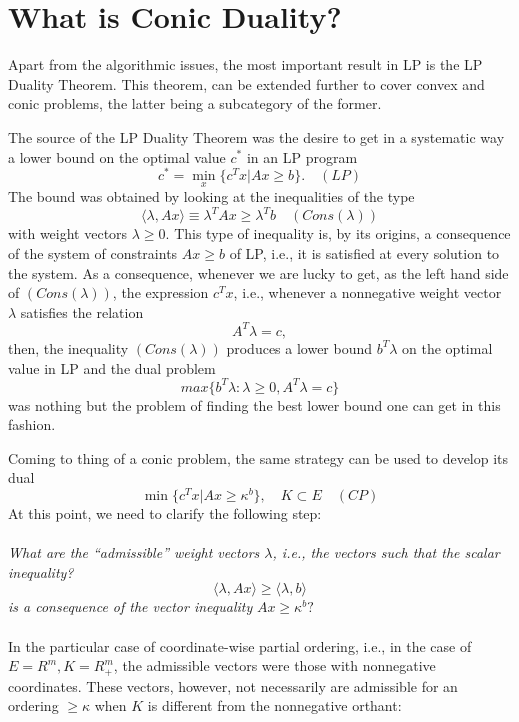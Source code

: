 \documentclass[12pt]{article}
\begin{document}
    \section{What is Conic Duality?}
    Apart from the algorithmic issues, the most important result in LP is the LP Duality Theorem. This theorem, can be extended further to cover convex and conic problems, the latter being a subcategory of the former. \par
    The source of the LP Duality Theorem was the desire to get in a systematic way a lower bound on the
    optimal value $c^*$ in an LP program
    $$c^* = \min\limits_{x} \{ c^T x | Ax \geq b \}. \quad (LP)$$
    The bound was obtained by looking at the inequalities of the type 
    $$\langle \lambda, Ax\rangle \equiv \lambda^T Ax \geq \lambda^T b \quad (Cons(\lambda))$$
    with weight vectors $\lambda \geq 0$. This type of inequality is, by its origins, a consequence of the system of constraints $Ax \geq b$ of LP, i.e., it is satisfied at every solution to the system. As a consequence, whenever we are lucky to get, as the left hand side of $(Cons(\lambda))$, the expression $c^T x$, i.e., whenever a nonnegative weight vector $\lambda$ satisfies the relation 
    $$A^T \lambda = c,$$
    then, the inequality $(Cons(\lambda))$ produces a lower bound $b^T \lambda$ on the optimal value in LP 
    and the dual problem 
    $$max \{b^T \lambda : \lambda \geq 0, A^T \lambda = c\}$$
    was nothing but the problem of finding the best lower bound one can get in this fashion.\par
    Coming to thing of a conic problem, the same strategy can be used to develop its dual
    $$\min \{ c^T x | Ax \geq \kappa^b \}, \quad K \subset E \quad (CP)$$
    At this point, we need to clarify the following step: \\ \\
    \textit{What are the “admissible” weight vectors $\lambda$, i.e., the vectors such that the scalar 
    inequality?}
    $$\langle \lambda, Ax\rangle \geq \langle \lambda, b\rangle$$
    \textit{is a consequence of the vector inequality} $Ax \geq \kappa^b ?$ \\ \\
    In the particular case of coordinate-wise partial ordering, i.e., in the case of $E = R^m , K = R_+^m $, 
    the admissible vectors were those with nonnegative coordinates. These vectors, however, not necessarily 
    are admissible for an ordering $\geq \kappa$ when $K$ is different from the nonnegative orthant:
    
\end{document}
